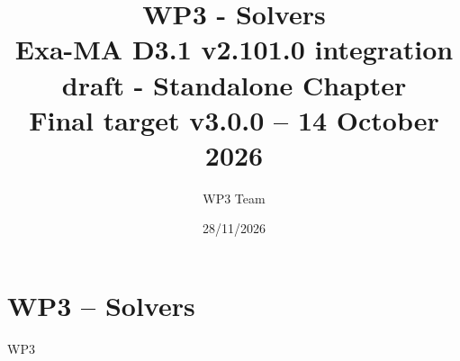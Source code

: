 \documentclass[11pt]{report}
\begin{document}
\title{WP3 - Solvers\\
\large Exa-MA D3.1 v2.101.0 integration draft - Standalone Chapter\\
\normalsize Final target v3.0.0 -- 14 October 2026}
\author{WP3 Team}
\date{28/11/2026}
\maketitle

\tableofcontents
\clearpage

\chapter{WP3 -- Solvers}
\label{chap:wp3}
{WP3}
\clearpage


\end{document}
